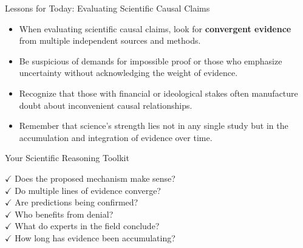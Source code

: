 \documentclass{beamer}
\begin{document}
	\begin{frame}{Lessons for Today: Evaluating Scientific Causal Claims}
		\begin{itemize}
			\item When evaluating scientific causal claims, look for \textbf{convergent evidence} from multiple independent sources and methods.
			\item Be suspicious of demands for impossible proof or those who emphasize uncertainty without acknowledging the weight of evidence.
			\item Recognize that those with financial or ideological stakes often manufacture doubt about inconvenient causal relationships.
			\item Remember that science's strength lies not in any single study but in the accumulation and integration of evidence over time.
		\end{itemize}
		
		\begin{block}{Your Scientific Reasoning Toolkit}
			\begin{center}
				$\checkmark$ Does the proposed mechanism make sense?\\
				$\checkmark$ Do multiple lines of evidence converge?\\
				$\checkmark$ Are predictions being confirmed?\\
				$\checkmark$ Who benefits from denial?\\
				$\checkmark$ What do experts in the field conclude?\\
				$\checkmark$ How long has evidence been accumulating?
			\end{center}
		\end{block}
	\end{frame}
\end{document}
